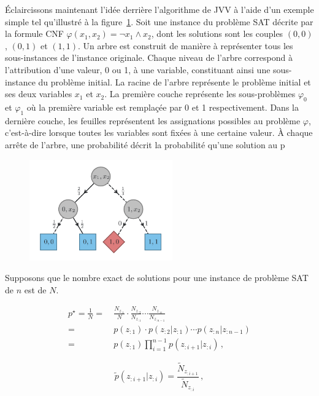 Éclaircissons maintenant l'idée derrière l'algorithme de JVV à l'aide d'un exemple simple tel qu'illustré à la figure~\ref{fig:algorithme-jvv}. Soit une instance du problème SAT décrite par la formule CNF $\varphi(x_{1}, x_{2}) = \neg x_{1} \land x_{2}$, dont les solutions sont les couples $(0,0)$, $(0,1)$ et $(1,1)$. Un arbre est construit de manière à représenter tous les sous-instances de l'instance originale. Chaque niveau de l'arbre correspond à l'attribution d'une valeur, 0 ou 1, à une variable, constituant ainsi une sous-instance du problème initial. La racine de l'arbre représente le problème initial et ses deux variables $x_{1}$ et $x_{2}$. La première couche représente les sous-problèmes $\varphi_{0}$ et $\varphi_{1}$ où la première variable est remplaçée par 0 et 1 respectivement. Dans la dernière couche, les feuilles représentent les assignations possibles au problème $\varphi$, c'est-à-dire lorsque toutes les variables sont fixées à une certaine valeur. À chaque arrête de l'arbre, une probabilité décrit la probabilité qu'une solution au p


\begin{figure}[h]
    \centering
    \includegraphics[width=0.55\textwidth]{figures/jvv-algorithm.pdf}
    \caption{}
    \label{fig:algorithme-jvv}
\end{figure}

Supposons que le nombre exact de solutions pour une instance de problème SAT de $n$ est de $N$. 

\begin{align}
    p^\star = \frac1N =&{\ } \frac{N_{z_{:1}}}{N} \cdot \frac{N_{z_{:2}}}{N_{z_{:1}}} \cdots \frac{N_{z_{:n}}}{N_{z_{:n-1}}} \\
    =&{\ } p(z_{:1}) \cdot p(z_{:2}|z_{:1}) \cdots p(z_{:n}|z_{:n-1}) \\
    =&{\ } p(z_{:1}) \prod_{i=1}^{n-1} p(z_{:i+1}|z_{:i}) \,,
\end{align}

\begin{equation}
    \tilde p(z_{:i+1}|z_{:i}) = \frac{ \tilde N_{z_{:i+1}} }{ \tilde N_{z_{:i}} } \,,
\end{equation}

